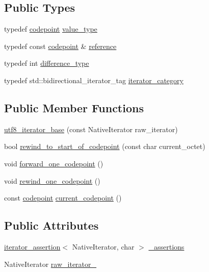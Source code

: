 \subsection*{Public Types}
{\bf }\par
\begin{DoxyCompactItemize}
\item 
typedef \hyperlink{classu5e_1_1codepoint}{codepoint} \hyperlink{classu5e_1_1utf8__iterator__base_a5048b05c23d80befdfdcc5a47b8bcbce}{value\+\_\+type}
\item 
typedef const \hyperlink{classu5e_1_1codepoint}{codepoint} \& \hyperlink{classu5e_1_1utf8__iterator__base_a49c75ca98a7c550f584e28e5ea1af883}{reference}
\item 
typedef int \hyperlink{classu5e_1_1utf8__iterator__base_a5b9d4769be94cd6a896ea2305927e467}{difference\+\_\+type}
\item 
typedef std\+::bidirectional\+\_\+iterator\+\_\+tag \hyperlink{classu5e_1_1utf8__iterator__base_a06735854415e6c5c5a7488c9fcd8a115}{iterator\+\_\+category}
\end{DoxyCompactItemize}

\subsection*{Public Member Functions}
\begin{DoxyCompactItemize}
\item 
\hyperlink{classu5e_1_1utf8__iterator__base_ae8727bcbe775266a0e71e441c9e0e75f}{utf8\+\_\+iterator\+\_\+base} (const Native\+Iterator raw\+\_\+iterator)
\item 
bool \hyperlink{classu5e_1_1utf8__iterator__base_a835eb35233e2f9995fb3ae305eb97030}{rewind\+\_\+to\+\_\+start\+\_\+of\+\_\+codepoint} (const char current\+\_\+octet)
\item 
void \hyperlink{classu5e_1_1utf8__iterator__base_a72dd067d0a8de9acf9892e6a1e1d0bc4}{forward\+\_\+one\+\_\+codepoint} ()
\item 
void \hyperlink{classu5e_1_1utf8__iterator__base_a4654e35335e651fcb745fb823ae7e1b9}{rewind\+\_\+one\+\_\+codepoint} ()
\item 
const \hyperlink{classu5e_1_1codepoint}{codepoint} \hyperlink{classu5e_1_1utf8__iterator__base_aef76c20634461c3acbb09e2e66f33c52}{current\+\_\+codepoint} ()
\end{DoxyCompactItemize}
\subsection*{Public Attributes}
\begin{DoxyCompactItemize}
\item 
\hyperlink{classu5e_1_1iterator__assertion}{iterator\+\_\+assertion}$<$ Native\+Iterator, char $>$ \hyperlink{classu5e_1_1utf8__iterator__base_ae3bac08f8551f282fa7e70a09fa5b37f}{\+\_\+assertions}
\item 
Native\+Iterator \hyperlink{classu5e_1_1utf8__iterator__base_a7b744615e45b142d6139a8920b70d2fc}{raw\+\_\+iterator\+\_\+}
\end{DoxyCompactItemize}


